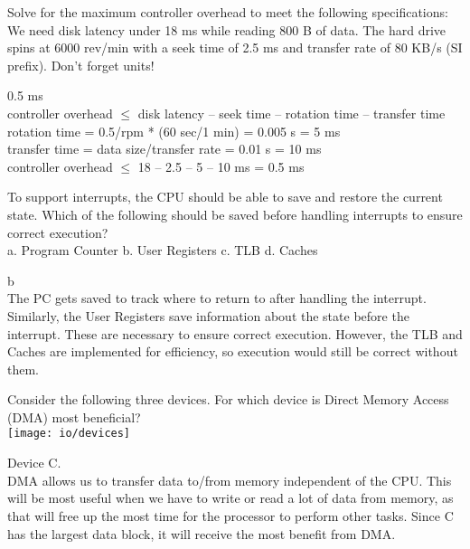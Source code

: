 \begin{blocksection}
\question 
Solve for the maximum controller overhead to meet the following specifications: We need disk latency under 18 ms while reading 800 B of data.  The hard drive spins at 6000 rev/min with a seek time of 2.5 ms and transfer rate of 80 KB/s (SI prefix).  Don’t forget units!
\begin{solution}[0.5in] 
0.5 ms \\
controller overhead $\leq$ disk latency – seek time – rotation time – transfer time \\
rotation time = 0.5/rpm * (60 sec/1 min) = 0.005 s = 5 ms \\
transfer time = data size/transfer rate = 0.01 s = 10 ms \\
controller overhead $\leq$ 18 – 2.5 – 5 – 10 ms = 0.5 ms\\
\end{solution}

\question
To support interrupts, the CPU should be able to save and restore the current state. Which of the following should be saved before handling interrupts to ensure correct execution? \\
a. Program Counter 	b. User Registers 	c. TLB 		d. Caches
\begin{solution}[0.5in] 
b \\
The PC gets saved to track where to return to after handling the interrupt. Similarly, the User Registers save information about the state before the interrupt. These are necessary to ensure correct execution. However, the TLB and Caches are implemented for efficiency, so execution would still be correct without them.
\end{solution}

\question
Consider the following three devices. For which device is Direct Memory Access (DMA) most beneficial?\\

\texttt{[image: io/devices]}
\begin{solution}[0.5in] 
Device C. \\
DMA allows us to transfer data to/from memory independent of the CPU. This will be most useful when we have to write or read a lot of data from memory, as that will free up the most time for the processor to perform other tasks. Since C has the largest data block, it will receive the most benefit from DMA.     
\end{solution}

\end{blocksection}